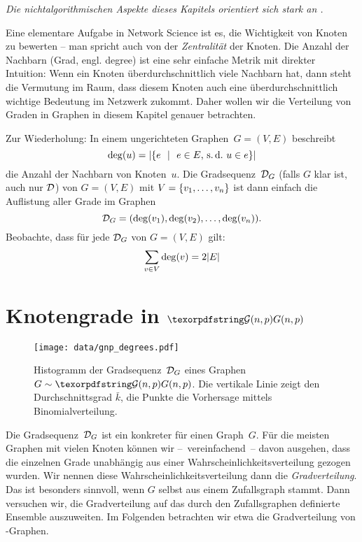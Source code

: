 \emph{Die nichtalgorithmischen Aspekte dieses Kapitels orientiert sich stark an \cite{barabasi2014network}.}
\bigskip

\noindent
Eine elementare Aufgabe in Network Science ist es, die Wichtigkeit von Knoten zu bewerten -- man spricht auch  von der \emph{Zentralität} der Knoten.
Die Anzahl der Nachbarn (Grad, engl. degree) ist eine sehr einfache Metrik mit direkter Intuition:
Wenn ein Knoten überdurchschnittlich viele Nachbarn hat, dann steht die Vermutung im Raum, dass diesem Knoten auch eine überdurchschnittlich wichtige Bedeutung im Netzwerk zukommt.
Daher wollen wir die Verteilung von Graden in Graphen in diesem Kapitel genauer betrachten.

Zur Wiederholung:
In einem ungerichteten Graphen~$G=(V,E)$ beschreibt
\begin{equation}
    \deg(u) = \card{\twoset{e}{e \in E\text{, \sd\ } u \in e}}
\end{equation}
die Anzahl der Nachbarn von Knoten~$u$.
Die  Gradsequenz~$\mathcal{D}_G$ (falls $G$ klar ist, auch nur $\mathcal{D}$) von $G=(V,E)$ mit $V=\left\{v_1, \ldots, v_n\right\}$ ist dann einfach die Auflistung aller Grade im Graphen
\begin{equation}
    \mathcal{D}_G = (\deg(v_1), \deg(v_2), \ldots, \deg(v_n)).
\end{equation}
Beobachte, dass für jede $\mathcal{D}_G$ von $G=(V,E)$ gilt:
\begin{equation}
    \sum_{v \in V} \deg(v) = 2 \lvert E\rvert
\end{equation}


\section{Knotengrade in $\Gnp$}
\begin{figure}
    \begin{center}
        \texttt{[image: data/gnp\_degrees.pdf]}
    \end{center}
    \caption{
        Histogramm der Gradsequenz~$\mathcal{D}_G$ eines Graphen~$G \sim \Gnp$.
        Die vertikale Linie zeigt den Durchschnittsgrad $\bar k$,
        die Punkte die Vorhersage mittels Binomialverteilung.
    }
    \label{fig:histogram_grade_gnp}
\end{figure}

Die Gradsequenz~$\mathcal{D}_G$ ist ein konkreter  für einen Graph~$G$.
Für die meisten Graphen mit vielen Knoten können wir --~vereinfachend~-- davon ausgehen, dass die einzelnen Grade unabhängig aus einer Wahrscheinlichkeitsverteilung gezogen wurden.
Wir  nennen diese Wahrscheinlichkeitsverteilung dann die \emph{Gradverteilung}.
Das ist besonders sinnvoll, wenn $G$ selbst aus einem Zufallsgraph stammt.
Dann versuchen wir, die Gradverteilung auf das durch den Zufallsgraphen definierte Ensemble auszuweiten.
Im Folgenden betrachten wir etwa die Gradverteilung von \Gnp-Graphen.

